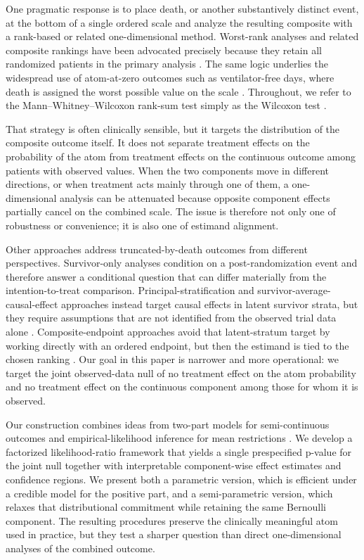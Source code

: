 \documentclass[11pt]{article}
\begin{document}
One pragmatic response is to place death, or another substantively distinct event, at the bottom of a single ordered scale and analyze the resulting composite with a rank-based or related one-dimensional method. Worst-rank analyses and related composite rankings have been advocated precisely because they retain all randomized patients in the primary analysis \citep{Lachin_1999,McMahon_2000,Colantuoni_2018}. The same logic underlies the widespread use of atom-at-zero outcomes such as ventilator-free days, where death is assigned the worst possible value on the scale \citep{Yehya_2019}. Throughout, we refer to the Mann--Whitney--Wilcoxon rank-sum test simply as the Wilcoxon test \citep{wilcoxon3001968individual,mann1947test}.

That strategy is often clinically sensible, but it targets the distribution of the composite outcome itself. It does not separate treatment effects on the probability of the atom from treatment effects on the continuous outcome among patients with observed values. When the two components move in different directions, or when treatment acts mainly through one of them, a one-dimensional analysis can be attenuated because opposite component effects partially cancel on the combined scale. The issue is therefore not only one of robustness or convenience; it is also one of estimand alignment.

Other approaches address truncated-by-death outcomes from different perspectives. Survivor-only analyses condition on a post-randomization event and therefore answer a conditional question that can differ materially from the intention-to-treat comparison. Principal-stratification and survivor-average-causal-effect approaches instead target causal effects in latent survivor strata, but they require assumptions that are not identified from the observed trial data alone \citep{Frangakis_2002,Colantuoni_2018}. Composite-endpoint approaches avoid that latent-stratum target by working directly with an ordered endpoint, but then the estimand is tied to the chosen ranking \citep{McMahon_2000,Colantuoni_2018}. Our goal in this paper is narrower and more operational: we target the joint observed-data null of no treatment effect on the atom probability and no treatment effect on the continuous component among those for whom it is observed.

Our construction combines ideas from two-part models for semi-continuous outcomes \citep{aitchison1955distribution,cragg1971some} and empirical-likelihood inference for mean restrictions \citep{owen1988empirical,owen1991empirical,kitamura2001asymptotic}. We develop a factorized likelihood-ratio framework that yields a single prespecified p-value for the joint null together with interpretable component-wise effect estimates and confidence regions. We present both a parametric version, which is efficient under a credible model for the positive part, and a semi-parametric version, which relaxes that distributional commitment while retaining the same Bernoulli component. The resulting procedures preserve the clinically meaningful atom used in practice, but they test a sharper question than direct one-dimensional analyses of the combined outcome.
\end{document}
